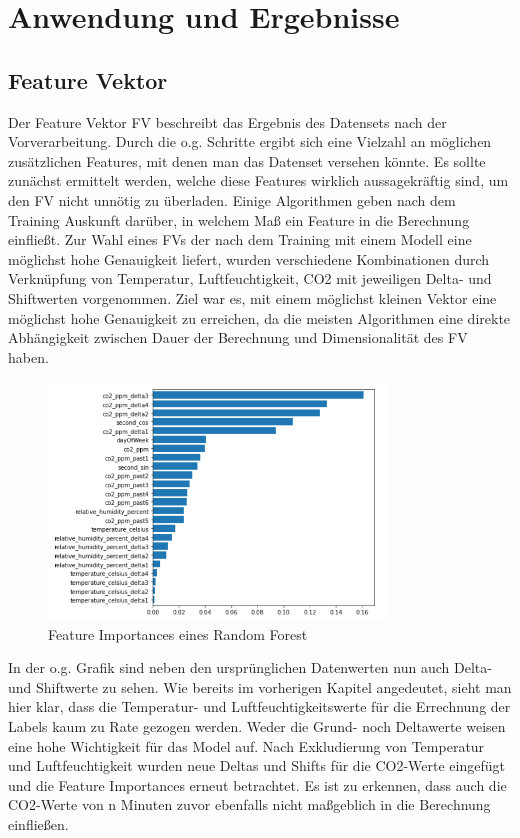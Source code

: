 \clearpage
\chapter{\textbf{Anwendung und Ergebnisse}}\label{kap5}

\section{Feature Vektor}
Der Feature Vektor FV beschreibt das Ergebnis des Datensets nach der Vorverarbeitung. 
Durch die o.g. Schritte ergibt sich eine Vielzahl an möglichen zusätzlichen Features,
mit denen man das Datenset versehen könnte. Es sollte zunächst ermittelt werden, welche diese Features wirklich 
aussagekräftig sind, um den FV nicht unnötig zu überladen. Einige Algorithmen geben nach dem Training 
Auskunft darüber, in welchem Maß ein Feature in die Berechnung einfließt. Zur Wahl eines FVs der 
nach dem Training mit einem Modell eine möglichst hohe Genauigkeit liefert, wurden verschiedene Kombinationen durch 
Verknüpfung von Temperatur, Luftfeuchtigkeit, CO2 mit jeweiligen Delta- und Shiftwerten vorgenommen. Ziel war es, 
mit einem möglichst kleinen Vektor eine möglichst hohe Genauigkeit zu erreichen, da die meisten Algorithmen eine 
direkte Abhängigkeit zwischen Dauer der Berechnung und Dimensionalität des FV haben.  

\begin{figure}[h]
    \centering
    \includegraphics[width=0.8\textwidth]{pic/feature_importances.png}
    \caption{Feature Importances eines Random Forest}
    \label{fig:FI}
\end{figure}

In der o.g. Grafik sind neben den ursprünglichen Datenwerten nun auch Delta- und Shiftwerte zu sehen. Wie bereits 
im vorherigen Kapitel angedeutet, sieht man hier klar, dass die Temperatur- und Luftfeuchtigkeitswerte für 
die Errechnung der Labels kaum zu Rate gezogen werden. Weder die Grund- noch Deltawerte weisen eine hohe 
Wichtigkeit für das Model auf.
\newpage
Nach Exkludierung von Temperatur und Luftfeuchtigkeit wurden neue Deltas und Shifts für die CO2-Werte eingefügt 
und die Feature Importances erneut betrachtet. Es ist zu erkennen, dass auch die CO2-Werte von n Minuten zuvor 
ebenfalls nicht maßgeblich in die Berechnung einfließen.\\

